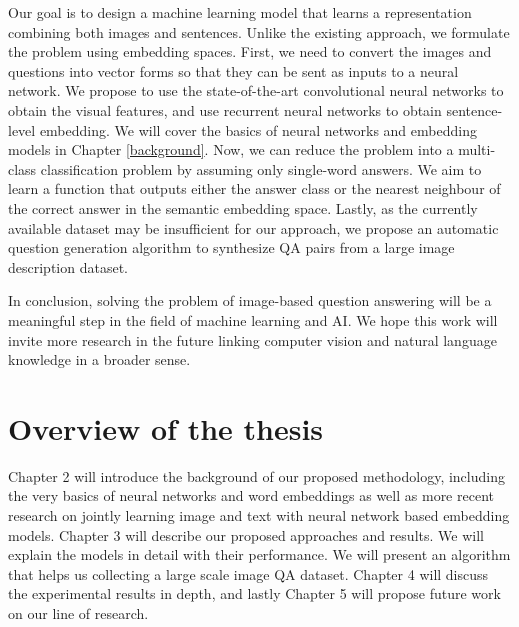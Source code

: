 Our goal is to design a machine learning model that learns a representation combining both images and sentences. Unlike the existing approach, we formulate the problem using embedding spaces. First, we need to convert the images and questions into vector forms so that they can be sent as inputs to a neural network. We propose to use the state-of-the-art convolutional neural networks to obtain the visual features, and use recurrent neural networks to obtain sentence-level embedding. We will cover the basics of neural networks and embedding models in Chapter \ref{background}. Now, we can reduce the problem into a multi-class classification problem by assuming only single-word answers. We aim to learn a function that outputs either the answer class or the nearest neighbour of the correct answer in the semantic embedding space. Lastly, as the currently available dataset may be insufficient for our approach, we propose an automatic question generation algorithm to synthesize QA pairs from a large image description dataset.

In conclusion, solving the problem of image-based question answering will be a meaningful step in the field of machine learning and AI. We hope this work will invite more research in the future linking computer vision and natural language knowledge in a broader sense.

\section{Overview of the thesis}

Chapter 2 will introduce the background of our proposed methodology, including the very basics of neural networks and word embeddings as well as more recent research on jointly learning image and text with neural network based embedding models. Chapter 3 will describe our proposed approaches and results. We will explain the models in detail with their performance. We will present an algorithm that helps us collecting a large scale image QA dataset. Chapter 4 will discuss the experimental results in depth, and lastly Chapter 5 will propose future work on our line of research.